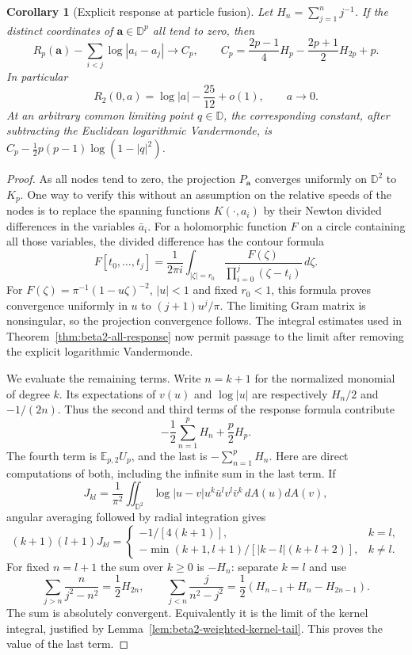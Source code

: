 \documentclass[11pt,a4paper]{article}
\numberwithin{equation}{section}
\newtheorem{corollary}[theorem]{Corollary}
\theoremstyle{definition}
\theoremstyle{remark}
\newcommand{\D}{\mathbb D}
\newcommand{\E}{\mathbb E}
\begin{document}
\begin{corollary}[Explicit response at particle fusion]
\label{cor:beta2-fusion-response}
Let $H_n=\sum_{j=1}^n j^{-1}$.  If the distinct coordinates of
$\mathbf a\in\D^p$ all tend to zero, then
\begin{equation}
 R_p(\mathbf a)-\sum_{i<j}\log|a_i-a_j|\longrightarrow C_p,
 \qquad
 C_p=\frac{2p-1}{4}H_p-\frac{2p+1}{2}H_{2p}+p.
 \label{eq:beta2-fusion-response}
\end{equation}
In particular
\[
 R_2(0,a)=\log|a|-\frac{25}{12}+o(1),\qquad a\to0.
\]
At an arbitrary common limiting point $q\in\D$, the corresponding
constant, after subtracting the Euclidean logarithmic Vandermonde,
is $C_p-\tfrac12p(p-1)\log(1-|q|^2)$.
\end{corollary}

\begin{proof}
As all nodes tend to zero, the projection $P_{\mathbf a}$ converges
uniformly on $\D^2$ to $K_p$.  One way to verify this without an
assumption on the relative speeds of the nodes is to replace the
spanning functions $K(\cdot,a_i)$ by their Newton divided differences
in the variables $\bar a_i$.  For a holomorphic function $F$ on a
circle containing all those variables, the divided difference has
the contour formula
\[
 F[t_0,\ldots,t_j]
 =\frac1{2\pi i}\int_{|\zeta|=r_0}
           \frac{F(\zeta)}{\prod_{i=0}^j(\zeta-t_i)}\,d\zeta.
\]
For $F(\zeta)=\pi^{-1}(1-u\zeta)^{-2}$, $|u|<1$ and fixed
$r_0<1$, this formula proves convergence uniformly in $u$ to
$(j+1)u^j/\pi$.  The limiting Gram matrix is nonsingular, so the
projection convergence follows.  The integral estimates used in
Theorem~\ref{thm:beta2-all-response} now permit passage to the limit
after removing the explicit logarithmic Vandermonde.

We evaluate the remaining terms.  Write $n=k+1$ for the normalized
monomial of degree $k$.  Its expectations of $v(u)$ and $\log|u|$
are respectively $H_n/2$ and $-1/(2n)$.  Thus the second and third
terms of the response formula contribute
\[
 -\frac12\sum_{n=1}^p H_n+\frac p2H_p.
\]
The fourth term is $\E_{p,2}U_p$, and the last is
$-\sum_{n=1}^pH_n$.  Here are direct computations of both, including
the infinite sum in the last term.  If
\[
 J_{kl}=\frac1{\pi^2}\iint_{\D^2}\log|u-v|
             u^k\bar u^l v^l\bar v^k\,dA(u)dA(v),
\]
angular averaging followed by radial integration gives
\[
 (k+1)(l+1)J_{kl}=
 \begin{cases}
 -1/[4(k+1)],&k=l,\\[2pt]
 -\min(k+1,l+1)/[|k-l|(k+l+2)],&k\ne l.
 \end{cases}
\]
For fixed $n=l+1$ the sum over $k\ge0$ is $-H_n$: separate $k=l$
and use
\[
 \sum_{j>n}\frac{n}{j^2-n^2}=\frac12H_{2n},\qquad
 \sum_{j<n}\frac{j}{n^2-j^2}
 =\frac12(H_{n-1}+H_n-H_{2n-1}).
\]
The sum is absolutely convergent.  Equivalently it is the limit of
the kernel integral, justified by
Lemma~\ref{lem:beta2-weighted-kernel-tail}.  This proves the value
of the last term.


\end{proof}
\end{document}
